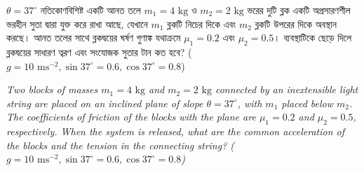 \documentclass[12pt, a4paper]{article}
\begin{document}
\begin{tcolorbox}[questionbox={প্রশ্ন (Question) 42}]
\noindent
$\theta = 37^\circ$ নতিকোণবিশিষ্ট একটি আনত তলে $m_1 = 4\text{ kg}$ ও $m_2 = 2\text{ kg}$ ভরের দুটি ব্লক একটি অপ্রসারণশীল ভরহীন সুতা দ্বারা যুক্ত করে রাখা আছে, যেখানে $m_1$ ব্লকটি নিচের দিকে এবং $m_2$ ব্লকটি উপরের দিকে অবস্থান করছে। আনত তলের সাথে ব্লকদ্বয়ের ঘর্ষণ গুণাঙ্ক যথাক্রমে $\mu_1 = 0.2$ এবং $\mu_2 = 0.5$। ব্যবস্থাটিকে ছেড়ে দিলে ব্লকদ্বয়ের সাধারণ ত্বরণ এবং সংযোজক সুতার টান কত হবে? ($g = 10\text{ ms}^{-2}, \sin 37^\circ = 0.6, \cos 37^\circ = 0.8$)

\vspace{0.8em}
\begin{english}
\noindent\textit{\color{darkgray}
Two blocks of masses $m_1 = 4\text{ kg}$ and $m_2 = 2\text{ kg}$ connected by an inextensible light string are placed on an inclined plane of slope $\theta = 37^\circ$, with $m_1$ placed below $m_2$. The coefficients of friction of the blocks with the plane are $\mu_1 = 0.2$ and $\mu_2 = 0.5$, respectively. When the system is released, what are the common acceleration of the blocks and the tension in the connecting string? ($g = 10\text{ ms}^{-2}, \sin 37^\circ = 0.6, \cos 37^\circ = 0.8$)
}
\end{english}
\end{tcolorbox}
\end{document}
